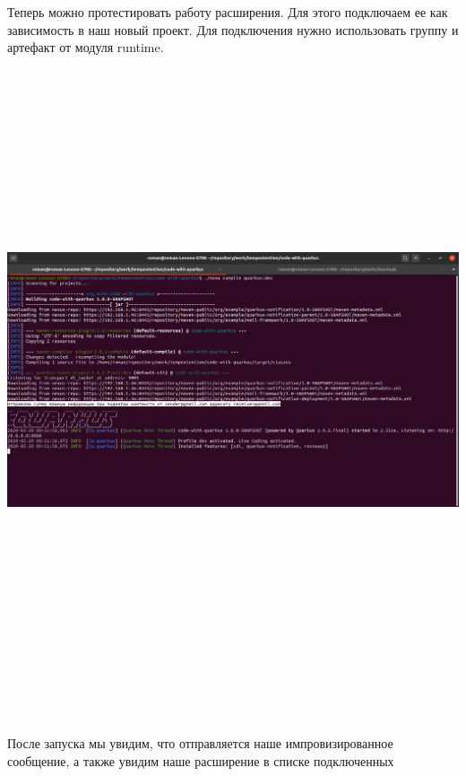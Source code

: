 \documentclass[russian,11pt]{article}
\begin{document}
Теперь можно протестировать работу расширения. Для этого подключаем ее как зависимость в наш новый проект. Для подключения нужно использовать группу и артефакт от модуля runtime.

\paragraph{\includegraphics[width=\textwidth, height=18cm]{11}}
~

После запуска мы увидим, что отправляется наше импровизированное сообщение, а также увидим наше расширение в списке подключенных
\end{document}
